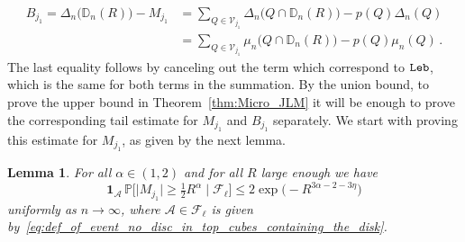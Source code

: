 \documentclass[11pt]{amsart}
\newtheorem{lemma}[theorem]{Lemma}
\theoremstyle{definition}
\theoremstyle{remark}
\numberwithin{equation}{section}
\newcommand{\bD}{\mathbb D}
\newcommand{\bP}{\mathbb P}
\begin{document}
	\begin{align}
		\label{eq:large_deviation_upper_bound_def_of_boundary_term}
		\nonumber
		B_{j_1} = \Delta_n\big(\bD_n(R)\big) - M_{j_1} &= \sum_{Q\in \mathcal{V}_{j_1}} \Delta_n\big(Q\cap \bD_n(R)\big) - p(Q) \Delta_n(Q) \\ &= \sum_{Q\in \mathcal{V}_{j_1}} \mu_n\big(Q\cap \bD_n(R)\big) - p(Q) \mu_n(Q) \, .
	\end{align}
	The last equality follows by canceling out the term which correspond to ${\tt Leb}$, which is the same for both terms in the summation. By the union bound, to prove the upper bound in Theorem~\ref{thm:Micro_JLM} it will be enough to prove the corresponding tail estimate for $M_{j_1}$ and $B_{j_1}$ separately. We start with proving this estimate for $M_{j_1}$, as given by the next lemma.
	\begin{lemma}
		\label{lemma:large_deviations_upper_bound_martingale_term}
		For all $\alpha\in(1,2)$ and for all $R$ large enough we have
		\[
		\mathbf{1}_{\mathcal{A}} \, \bP\Big[\big| M_{j_1} \big| \ge \tfrac{1}{2} R^{\alpha} \mid \mathcal{F}_\ell\Big] \le 2\exp\Big(-R^{3\alpha -2 - 3\eta}\Big) 
		\]
		uniformly as $n\to \infty$, where $\mathcal{A}\in \mathcal{F}_{\ell}$ is given by~\eqref{eq:def_of_event_no_disc_in_top_cubes_containing_the_disk}.
	\end{lemma}
\end{document}
